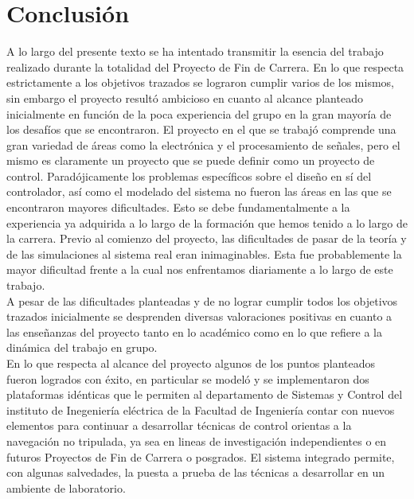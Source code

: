 \documentclass[main]{subfiles}
\begin{document}
\chapter*{Conclusi\'on}

A lo largo del presente texto se ha intentado transmitir la esencia  del trabajo realizado durante la totalidad del Proyecto de Fin de Carrera. En lo que respecta estrictamente a los objetivos trazados se lograron cumplir varios de los mismos, sin embargo el proyecto result\'o ambicioso en cuanto al alcance planteado inicialmente en funci\'on de la poca experiencia del grupo en la gran mayor\'ia de los desaf\'ios que se encontraron. El proyecto en el que se trabaj\'o comprende una gran variedad de \'areas como la electr\'onica y el procesamiento de señales, pero el mismo es claramente un proyecto que se puede definir como un proyecto de control. Parad\'ojicamente los problemas espec\'ificos sobre el diseño en s\'i del controlador, as\'i como el modelado del sistema no fueron las \'areas en las que se encontraron mayores dificultades. Esto se debe fundamentalmente a la experiencia ya adquirida a lo largo de la formaci\'on que hemos tenido a lo largo de la carrera. Previo al comienzo del proyecto, las dificultades de pasar de la teor\'ia y de las simulaciones al sistema real eran inimaginables. Esta fue probablemente la mayor dificultad frente a la cual nos enfrentamos diariamente a lo largo de este trabajo.\\ 

A pesar de las dificultades planteadas y de no lograr cumplir todos los objetivos trazados inicialmente se desprenden diversas valoraciones positivas en cuanto a las enseñanzas del proyecto tanto en lo acad\'emico como en lo que refiere a la din\'amica del trabajo en grupo.\\

En lo que respecta al alcance del proyecto algunos de los puntos planteados fueron logrados con \'exito, en particular se model\'o y se implementaron dos plataformas id\'enticas que le permiten al departamento de Sistemas y Control del instituto de Inegenier\'ia el\'ectrica de la Facultad de Ingenier\'ia contar con nuevos elementos para continuar a desarrollar t\'ecnicas de control orientas a la navegaci\'on no tripulada, ya sea en lineas de investigaci\'on independientes o en futuros Proyectos de Fin de Carrera o posgrados. El sistema integrado permite, con algunas salvedades, la puesta a prueba de las t\'ecnicas a desarrollar en un ambiente de laboratorio.\\
\end{document}
